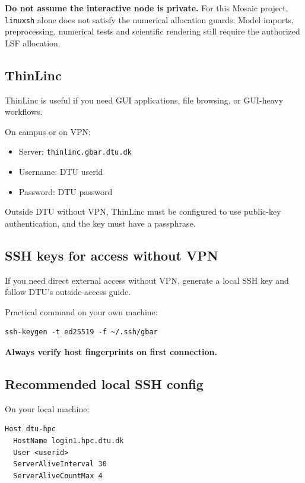 \documentclass[11pt,a4paper]{article}
\begin{document}
\textbf{Do not assume the interactive node is private.}
For this Mosaic project, \texttt{linuxsh} alone does not satisfy the numerical
allocation guards. Model imports, preprocessing, numerical tests and scientific
rendering still require the authorized LSF allocation.

\subsection{ThinLinc}

ThinLinc is useful if you need GUI applications, file browsing, or GUI-heavy workflows.

On campus or on VPN:
\begin{itemize}[leftmargin=1.5em]
  \item Server: \texttt{thinlinc.gbar.dtu.dk}
  \item Username: DTU userid
  \item Password: DTU password
\end{itemize}

Outside DTU without VPN, ThinLinc must be configured to use public-key authentication, and the key must have a passphrase.

\subsection{SSH keys for access without VPN}

If you need direct external access without VPN, generate a local SSH key and follow DTU's outside-access guide.

Practical command on your own machine:

\begin{lstlisting}[style=shell]
ssh-keygen -t ed25519 -f ~/.ssh/gbar
\end{lstlisting}

\textbf{Always verify host fingerprints on first connection.}

\subsection{Recommended local SSH config}

On your local machine:

\begin{lstlisting}[style=shell]
Host dtu-hpc
  HostName login1.hpc.dtu.dk
  User <userid>
  ServerAliveInterval 30
  ServerAliveCountMax 4
\end{lstlisting}
\end{document}
